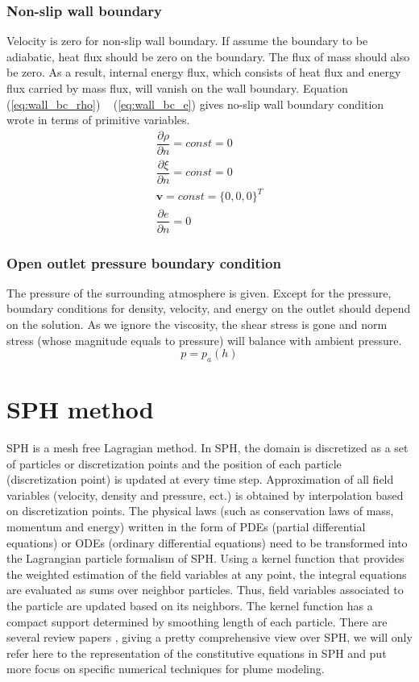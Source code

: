\documentclass[journal abbreviation, manuscript]{copernicus}
\begin{document}
\subsubsection{Non-slip wall boundary}
Velocity is zero for non-slip wall boundary. If assume the boundary to be adiabatic, heat flux should be zero on the boundary. The flux of mass should also be zero. As a result, internal energy flux, which consists of heat flux and energy flux carried by mass flux, will vanish on the wall boundary. Equation (\ref{eq:wall_bc_rho}) ~ (\ref{eq:wall_bc_e}) gives no-slip wall boundary condition wrote in terms of primitive variables.
\begin{align}
\dfrac{\partial \rho}{\partial n} = const = 0\label{eq:wall_bc_rho} \\
\dfrac{\partial \xi}{\partial n} = const = 0 \label{eq:wall_bc_xi}\\ 
\textbf{v} = const =\{0,0,0\}^T \label{eq:wall_bc_v}\\
\dfrac{\partial e }{\partial n} = 0\label{eq:wall_bc_e}
\end{align} 
\subsubsection{Open outlet pressure boundary condition}
The pressure of the surrounding atmosphere is given. Except for the pressure, boundary conditions for density, velocity, and energy on the outlet should depend on the solution. As we ignore the viscosity, the shear stress is gone and norm stress (whose magnitude equals to pressure) will balance with ambient pressure.
\begin{equation}
p = p_a(h)\label{eq:pressure_bc_p} 
\end{equation} 
%
\section{SPH method} \label{sec:SPH_method}
SPH is a mesh free Lagragian method. In SPH, the domain is discretized as a set of particles or discretization points and the position of each particle (discretization point) is updated at every time step. Approximation of all field variables (velocity, density and pressure, ect.) is obtained by interpolation based on discretization points. The physical laws (such as conservation laws of mass, momentum and energy) written in the form of PDEs (partial differential equations)  or ODEs (ordinary differential equations) need to be transformed into the Lagrangian particle formalism of SPH. Using a kernel function that provides the weighted estimation of the field variables at any point, the integral equations are evaluated as sums over neighbor particles. Thus, field variables associated to the particle are updated based on its neighbors. The kernel function has a compact support determined by smoothing length of each particle. There are several review papers \citep{monaghan1992smoothed, monaghan2005smoothed, rosswog2009astrophysical, price2012smoothed, monaghan2012smoothed}, giving a pretty comprehensive view over SPH, we will only refer here to the representation of the constitutive equations in SPH and put more focus on specific numerical techniques for plume modeling.
\end{document}
